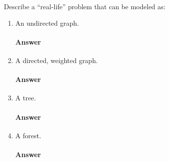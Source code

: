 \documentclass{article}
\begin{document}
\collab{\todo{}}

Describe a ``real-life'' problem that can be modeled as:

\begin{enumerate}
    \item An undirected graph.

        \paragraph{Answer}
        \todo{}

    \item A directed, weighted graph.

        \paragraph{Answer}
        \todo{}

    \item A tree.

        \paragraph{Answer}
        \todo{}

    \item A forest.

        \paragraph{Answer}
        \todo{}

\end{enumerate}
\end{document}
